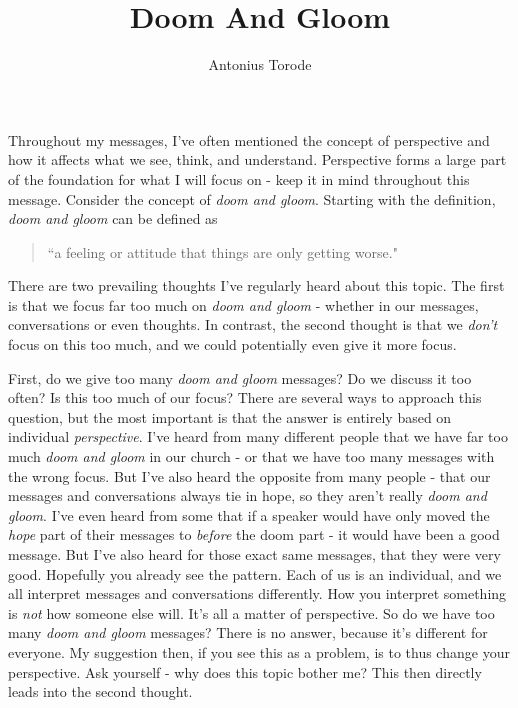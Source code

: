 \documentclass[10pt]{article}
\title{Doom And Gloom}
\author{Antonius Torode}
\begin{document}
\maketitle
\thispagestyle{fancy}

\begin{multicols}{2}

Throughout my messages, I've often mentioned the concept of perspective and how it affects what we see, think, and understand. Perspective forms a large part of the foundation for what I will focus on - keep it in mind throughout this message. Consider the concept of \textit{doom and gloom}. Starting with the definition, \textit{doom and gloom} can be defined as 

\begin{quotation}
	``a feeling or attitude that things are only getting worse." \cite{Dictionary}
\end{quotation}

There are two prevailing thoughts I've regularly heard about this topic. The first is that we focus far too much on \textit{doom and gloom} - whether in our messages, conversations or even thoughts. In contrast, the second thought is that we \textit{don't} focus on this too much, and we could potentially even give it more focus.

First, do we give too many \textit{doom and gloom} messages? Do we discuss it too often? Is this too much of our focus? There are several ways to approach this question, but the most important is that the answer is entirely based on individual \textit{perspective}. I've heard from many different people that we have far too much \textit{doom and gloom} in our church - or that we have too many messages with the wrong focus. But I've also heard the opposite from many people - that our messages and conversations always tie in hope, so they aren't really \textit{doom and gloom}. I've even heard from some that if a speaker would have only moved the \textit{hope} part of their messages to \textit{before} the doom part - it would have been a good message. But I've also heard for those exact same messages, that they were very good. Hopefully you already see the pattern. Each of us is an individual, and we all interpret messages and conversations differently. How you interpret something is \textit{not} how someone else will. It's all a matter of perspective. So do we have too many \textit{doom and gloom} messages? There is no answer, because it's different for everyone. My suggestion then, if you see this as a problem, is to thus change your perspective. Ask yourself - why does this topic bother me? This then directly leads into the second thought.


\end{multicols}
\end{document}
